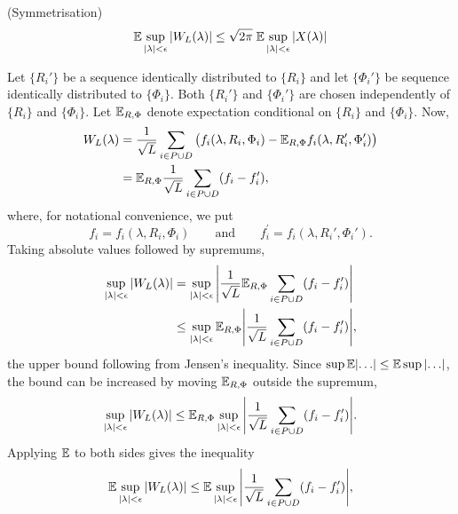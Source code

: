 \documentclass[journal]{IEEEtran}
\begin{document}
\begin{lemma}\label{lem:symmetrisation} (Symmetrisation)
\[
{\mathbb E} \sup_{{\vert \lambda \vert} < \epsilon} {\left\vert  W_L(\lambda) \right\vert} \leq \sqrt{2\pi} \; {\mathbb E} \sup_{{\vert \lambda \vert} < \epsilon}  {\left\vert  X(\lambda)  \right\vert}
\]
\end{lemma}
\begin{IEEEproof}
Let $\{R_i'\}$ be a sequence identically distributed to $\{R_i\}$ and let $\{\Phi_i'\}$ be sequence identically distributed to $\{\Phi_i\}$.  Both $\{R_i'\}$ and $\{\Phi_i'\}$ are chosen independently of $\{R_i\}$ and $\{\Phi_i\}$.  Let ${\mathbb E}_{R,\Phi}$ denote expectation conditional on $\{R_i\}$ and $\{\Phi_i\}$.  Now,
\begin{align*}
W_L(\lambda) &= \frac{1}{\sqrt{L}} \sum_{i \in P \cup D} \big( f_i(\lambda, R_i, \Phi_i) - {\mathbb E}_{R,\Phi} f_i(\lambda, R_i', \Phi_i') \big) \\
&= {\mathbb E}_{R,\Phi} \frac{1}{\sqrt{L}} \sum_{i \in P \cup D} ( f_{i} - f_{i}^\prime ),
\end{align*}
where, for notational convenience, we put 
\[
f_{i} = f_i(\lambda, R_i, \Phi_i) \qquad \text{and} \qquad  f_{i}^\prime = f_i(\lambda, R_i', \Phi_i').
\] 
Taking absolute values followed by supremums,
\begin{align*}
 \sup_{{\vert \lambda \vert} < \epsilon} {\left\vert  W_L(\lambda) \right\vert} &= \sup_{{\vert \lambda \vert} < \epsilon}  {\left\vert \frac{1}{\sqrt{L}} {\mathbb E}_{R,\Phi} \sum_{i \in P \cup D} (f_{i} - f_{i}^\prime ) \right\vert} \\
&\leq \sup_{{\vert \lambda \vert} < \epsilon} {\mathbb E}_{R,\Phi}  {\left\vert  \frac{1}{\sqrt{L}} \sum_{i \in P \cup D}  (f_{i} - f_{i}^\prime)  \right\vert},
\end{align*}
the upper bound following from Jensen's inequality.  Since $\sup \expect \abs{\dots} \leq \expect \sup \abs{\dots}$, the bound can be increased by moving ${\mathbb E}_{R,\Phi}$ outside the supremum,
\begin{equation}\label{eq:Eoutsidesup}
 \sup_{{\vert \lambda \vert} < \epsilon} {\left\vert  W_L(\lambda) \right\vert} \leq {\mathbb E}_{R,\Phi} \sup_{{\vert \lambda \vert} < \epsilon} {\left\vert  \frac{1}{\sqrt{L}}\sum_{i \in P \cup D} ( f_{i} - f_{i}^\prime )  \right\vert}.
\end{equation}
Applying ${\mathbb E}$ to both sides gives the inequality
\begin{equation}\label{eq:Gninequfin}
 {\mathbb E} \sup_{{\vert \lambda \vert} < \epsilon} {\left\vert  W_L(\lambda) \right\vert} \leq  {\mathbb E} \sup_{{\vert \lambda \vert} < \epsilon} {\left\vert  \frac{1}{\sqrt{L}}\sum_{i \in P \cup D} (f_{i} - f_{i}^\prime)  \right\vert},
\end{equation}

\end{IEEEproof}
\end{document}

